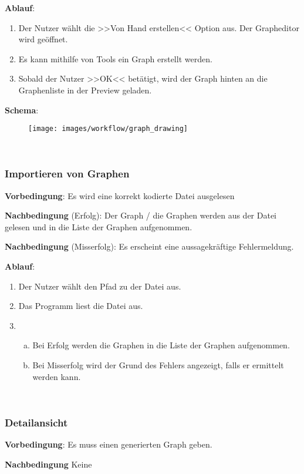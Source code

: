\documentclass{article}
\begin{document}
	\textbf{Ablauf}:
	\begin{enumerate}[1)]
		\item{Der Nutzer wählt die >>Von Hand erstellen<< Option aus. Der Grapheditor wird geöffnet.}
		\item{Es kann mithilfe von Tools ein Graph erstellt werden.}
		\item{Sobald der Nutzer >>OK<< betätigt, wird der Graph hinten an die Graphenliste in der Preview geladen.}
	\end{enumerate}
	
	\textbf{Schema}:
	~\begin{figure}[!h]
		\centering
		\texttt{[image: images/workflow/graph\_drawing]}
	\end{figure}
	
	
	\FloatBarrier
	~\newpage
	\subsubsection{Importieren von Graphen}
	\textbf{Vorbedingung}: Es wird eine korrekt kodierte Datei ausgelesen
	
	\textbf{Nachbedingung} (Erfolg): Der Graph / die Graphen werden aus der Datei gelesen und in die Liste der Graphen aufgenommen.
	
	\textbf{Nachbedingung} (Misserfolg): Es erscheint eine aussagekräftige Fehlermeldung.
	
	\textbf{Ablauf}:
	\begin{enumerate}[1)]
		\item{Der Nutzer wählt den Pfad zu der Datei aus.}
		\item{Das Programm liest die Datei aus.}
		\item{
			\begin{enumerate}[a)]
				\item{Bei Erfolg werden die Graphen in die Liste der Graphen aufgenommen.}
				\item{Bei Misserfolg wird der Grund des Fehlers angezeigt, falls er ermittelt werden kann.}
			\end{enumerate}
		}
	\end{enumerate}
	
	
	\FloatBarrier
	~\newpage
	\subsubsection{Detailansicht}
	\textbf{Vorbedingung}: Es muss einen generierten Graph geben.
	
	\textbf{Nachbedingung} Keine
	
\end{document}
